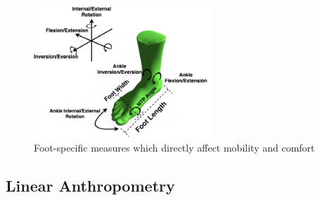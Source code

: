 \documentclass[defaultstyle,11pt]{comps}
\providecommand{\DIFaddbeginFL}{} %
\providecommand{\DIFaddendFL}{} %
\providecommand{\DIFdelbeginFL}{} %
\providecommand{\DIFdelendFL}{} %
\newcommand{\DIFscaledelfig}{0.5}
\newlength{\DIFdelgraphicswidth} %
\newlength{\DIFdelgraphicsheight} %
\newcommand{\DIFaddincludegraphics}[2][]{{\color{blue}\fbox{\DIFOincludegraphics[#1]{#2}}}} %
\newcommand{\DIFdelincludegraphics}[2][]{%
\sbox{\DIFdelgraphicsbox}{\DIFOincludegraphics[#1]{#2}}%
\settoboxwidth{\DIFdelgraphicswidth}{\DIFdelgraphicsbox} %
\settoboxtotalheight{\DIFdelgraphicsheight}{\DIFdelgraphicsbox} %
\scalebox{\DIFscaledelfig}{%
\parbox[b]{\DIFdelgraphicswidth}{\usebox{\DIFdelgraphicsbox}\\[-\baselineskip] \rule{\DIFdelgraphicswidth}{0em}}\llap{\resizebox{\DIFdelgraphicswidth}{\DIFdelgraphicsheight}{%
\setlength{\unitlength}{\DIFdelgraphicswidth}%
\begin{picture}(1,1)%
\thicklines\linethickness{2pt} %
{\color[rgb]{1,0,0}\put(0,0){\framebox(1,1){}}}%
{\color[rgb]{1,0,0}\put(0,0){\line( 1,1){1}}}%
{\color[rgb]{1,0,0}\put(0,1){\line(1,-1){1}}}%
\end{picture}%
}\hspace*{3pt}}} %
} %
\DeclareRobustCommand{\DIFaddbeginFL}{\DIFOaddbeginFL \let\includegraphics\DIFaddincludegraphics} %
\DeclareRobustCommand{\DIFaddendFL}{\DIFOaddendFL \let\includegraphics\DIFOincludegraphics} %
\DeclareRobustCommand{\DIFdelbeginFL}{\DIFOdelbeginFL \let\includegraphics\DIFdelincludegraphics} %
\DeclareRobustCommand{\DIFdelendFL}{\DIFOaddendFL \let\includegraphics\DIFOincludegraphics} %
\begin{document}
\begin{figure}
\DIFdelbeginFL %
\DIFdelendFL \DIFaddbeginFL \hypertarget{fig:SA3-Foot}{%
\centering
\includegraphics[width=0.6\textwidth,height=\textheight]{../fig/SA3/FootOverview.png}
\caption{Foot-specific measures which directly affect mobility and comfort}\label{fig:SA3-Foot}
}
\DIFaddendFL \end{figure}

\hypertarget{linear-anthropometry}{%
\subsection{Linear Anthropometry}\label{linear-anthropometry}}
\end{document}
